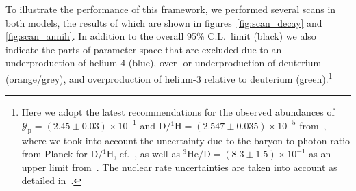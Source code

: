 \documentclass[11pt,a4paper]{article}
\begin{document}
To illustrate the performance of this framework, we performed several scans in both models, the results of which are shown in figures~\ref{fig:scan_decay} and \ref{fig:scan_annih}. In addition to the overall 95\% C.L.\ limit (black)
we also indicate the parts of parameter space that are excluded due to an underproduction of helium-4 (blue), over- or underproduction of deuterium (orange/grey), and overproduction of helium-3 relative to deuterium (green).\footnote{Here we adopt the latest recommendations for the observed abundances of $\mathcal{Y}_\mathrm{p} = (2.45 \pm 0.03) \times 10^{-1}$ and $\text{D}/{}^1\text{H} = (2.547 \pm 0.035) \times 10^{-5}$ from~\cite{Zyla:2020zbs}, where we took into account the uncertainty due to the baryon-to-photon ratio from Planck for $\text{D}/{}^1\text{H}$, cf.\ \cite{Aghanim:2018eyx,Depta:2020wmr}, as well as ${}^3 \text{He}/\text{D} = (8.3 \pm 1.5) \times 10^{-1}$ as an upper limit from~\cite{Geiss2003}. The nuclear rate uncertainties are taken into account as detailed in~\cite{Hufnagel:2018bjp}.}
\end{document}
